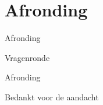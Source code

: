 \documentclass{beamer}
\begin{document}
\part{Afronding}
\begin{frame}{Afronding}
  \transfade
  \begin{center}
    Vragenronde
  \end{center}
\end{frame}
\begin{frame}{Afronding}
  \transfade
  \begin{center}
    Bedankt voor de aandacht
  \end{center}
\end{frame}


\HoGentLogo
\end{document}
